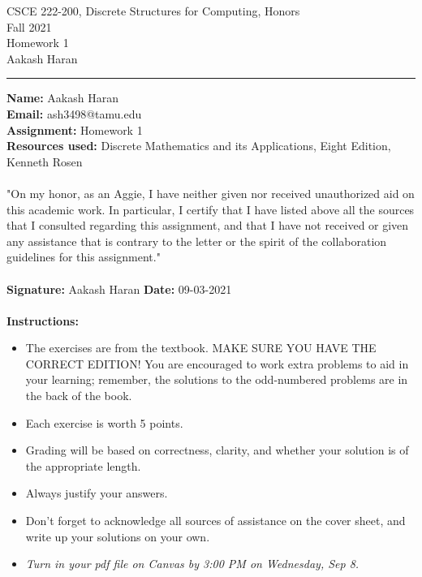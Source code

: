 \documentclass[12pt]{article}  %
\begin{document}
\begin{center}         %
{\large                %
CSCE 222-200, Discrete Structures for Computing, Honors \\  %
Fall 2021 \\
Homework 1 \\
Aakash Haran}
\end{center}


\rule{6in}{.1pt}       %
                    
\noindent              %
{\bf Name: } Aakash Haran \\
{\bf Email: }  ash3498@tamu.edu \\
{\bf Assignment: } Homework 1\\
{\bf Resources used: } Discrete Mathematics and its Applications, Eight Edition, Kenneth Rosen\\
\\
"On my honor, as an Aggie, I have neither given nor received unauthorized aid on this academic work. In particular, I certify that I have listed above all the sources that I consulted regarding this assignment, and that I have not received or given any assistance that is contrary to the letter or the spirit of the collaboration guidelines for this assignment."\\\\
\noindent
{\bf Signature: } Aakash Haran          {\bf Date: } 09-03-2021\\ 
\\
\noindent
{\bf Instructions:}    %

\begin{itemize}        %
\item The exercises are from the textbook.  MAKE SURE YOU HAVE THE CORRECT
      EDITION!  You are encouraged to work
      extra problems to aid in your learning; remember, the solutions to 
      the odd-numbered problems are in the back of the book.
\item Each exercise is worth 5 points.
\item Grading will be based on correctness, clarity, and whether your
      solution is of the appropriate length.
\item Always justify your answers.
\item Don't forget to acknowledge all sources of assistance on the cover
      sheet, and write up your solutions on your own.
\item {\em Turn in your pdf file on Canvas by 3:00 PM on Wednesday, Sep 8.}
\end{itemize}
\end{document}
